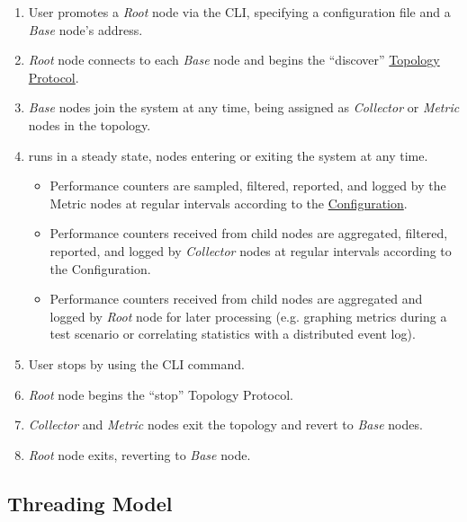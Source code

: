 \begin{enumerate}

\item User promotes a \textit{Root} node via the \dcamp CLI, specifying a configuration file and a \textit{Base} node's
      address.
\item \textit{Root} node connects to each \textit{Base} node and begins the ``discover'' \hyperref[proto_topo]{Topology
      Protocol}.
\item \textit{Base} nodes join the \dcamp system at any time, being assigned as \textit{Collector} or \textit{Metric}
      nodes in the topology.

\item \dcamp runs in a steady state, nodes entering or exiting the system at any time.

      \begin{itemize}
      \item Performance counters are sampled, filtered, reported, and logged by the Metric nodes at regular intervals
            according to the \hyperref[configuration]{\dcamp Configuration}.
      \item Performance counters received from child nodes are aggregated, filtered, reported, and logged by
            \textit{Collector} nodes at regular intervals according to the \dcamp Configuration.
      \item Performance counters received from child nodes are aggregated and logged by \textit{Root} node for later
	    processing (e.g. graphing metrics during a test scenario or correlating statistics with a distributed event
	    log).
      \end{itemize}

\item User stops \dcamp by using the \dcamp CLI command.
\item \textit{Root} node begins the ``stop'' Topology Protocol.
\item \textit{Collector} and \textit{Metric} nodes exit the topology and revert to \textit{Base} nodes.
\item \textit{Root} node exits, reverting to \textit{Base} node.

\end{enumerate}

\subsection{Threading Model}
\label{threading_model}

